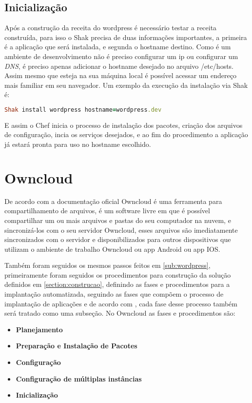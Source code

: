 \subsection{Inicialização}

Após a construção da receita do wordpress é necessário testar a receita construída,
para isso o Shak precisa de duas informações importantes, a primeira é a aplicação
que será instalada, e segunda o hostname destino. Como é um ambiente de desenvolvimento
não é preciso configurar um ip ou configurar um \textit{DNS}, é preciso apenas adicionar o
hostname desejado no arquivo /etc/hosts. Assim mesmo que esteja na sua máquina local
é possível acessar um endereço mais familiar em seu navegador. Um exemplo da execução
da instalação via Shak é:

\begin{lstlisting}[language=Ruby,label=dice_index,caption={Exemplo de exexução de instalação do wordpress com shak}]
Shak install wordpress hostname=wordpress.dev
\end{lstlisting}

E assim o Chef inicia o processo de instalação dos pacotes, criação dos arquivos
de configuração, incia os serviços desejados, e ao fim do procedimento a aplicação
já estará pronta para uso no hostname escolhido.

\section{Owncloud}
\label{sub:owncloud}

De acordo com a documentação oficial \cite{owncloud} Owncloud é uma ferramenta
para compartilhamento de arquivos, é um software livre em que é possível compartilhar
um ou mais arquivos e pastas do seu computador na nuvem, e sincronizá-los com o seu
servidor Owncloud, esses arquivos são imediatamente sincronizados com o servidor
e disponibilizados para outros dispositivos que utilizam o ambiente de trabalho
Owncloud ou app Android ou app IOS.

Também foram seguidos os mesmos passos feitos em \ref{sub:wordpress}, primeiramente
foram seguidos os procedimentos para construção da solução definidos em \ref{section:construcao},
definindo as fases e procedimentos para a implantação automatizada, seguindo as
fases que compõem o processo de implantação de aplicações e de acordo com \cite{omg2006},
cada fase desse processo também será tratado como uma subseção. No Owncloud as
fases e procedimentos são:

\begin{itemize}
  \item  \textbf{Planejamento}
  \item  \textbf{Preparação e Instalação de Pacotes}
  \item  \textbf{Configuração}
  \item  \textbf{Configuração de múltiplas instâncias}
  \item  \textbf{Inicialização}
\end{itemize}


